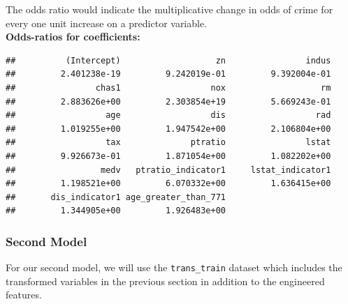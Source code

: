 \documentclass[3p]{elsarticle} %
\begin{document}
The odds ratio would indicate the multiplicative change in odds of crime
for every one unit increase on a predictor variable.\\
\textbf{Odds-ratios for coefficients:}

\begin{verbatim}
##          (Intercept)                   zn                indus 
##         2.401238e-19         9.242019e-01         9.392004e-01 
##                chas1                  nox                   rm 
##         2.883626e+00         2.303854e+19         5.669243e-01 
##                  age                  dis                  rad 
##         1.019255e+00         1.947542e+00         2.106804e+00 
##                  tax              ptratio                lstat 
##         9.926673e-01         1.871054e+00         1.082202e+00 
##                 medv   ptratio_indicator1     lstat_indicator1 
##         1.198521e+00         6.070332e+00         1.636415e+00 
##       dis_indicator1 age_greater_than_771 
##         1.344905e+00         1.926483e+00
\end{verbatim}

\hypertarget{second-model}{%
\subsubsection{Second Model}\label{second-model}}

For our second model, we will use the \texttt{trans\_train} dataset
which includes the transformed variables in the previous section in
addition to the engineered features.
\end{document}
